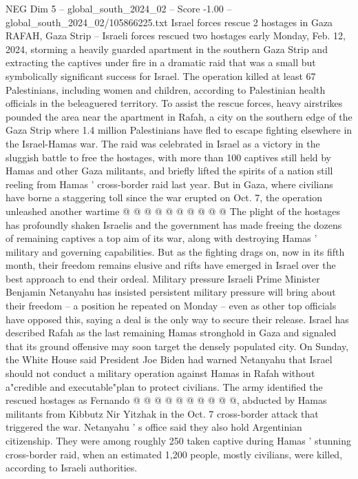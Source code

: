 \begin{textsample}{NEG Dim 5 – global\_south\_2024\_02 – Score -1.00 – global\_south\_2024\_02/105866225.txt}  \label{ex:f5_neg_251}
Israel forces rescue 2 hostages in Gaza RAFAH, Gaza Strip -- Israeli forces rescued two hostages early Monday, Feb. 12, 2024, storming a heavily guarded apartment in the southern Gaza Strip and extracting the captives under fire in a dramatic raid that was a small but symbolically significant success for Israel.
The operation killed at least 67 Palestinians, including women and children, according to Palestinian health officials in the beleaguered territory.
To assist the rescue forces, heavy airstrikes pounded the area near the apartment in Rafah, a city on the southern edge of the Gaza Strip where 1.4 million Palestinians have fled to escape fighting elsewhere in the Israel-Hamas war.
The raid was celebrated in Israel as a victory in the sluggish battle to free the hostages, with more than 100 captives still held by Hamas and other Gaza militants, and briefly lifted the spirits of a nation still reeling from Hamas ' cross-border raid last year.
But in Gaza, where civilians have borne a staggering toll since the war erupted on Oct. 7, the operation unleashed another wartime @ @ @ @ @ @ @ @ @ @ The plight of the hostages has profoundly shaken Israelis and the government has made freeing the dozens of remaining captives a top aim of its war, along with destroying Hamas ' military and governing capabilities.
But as the fighting drags on, now in its fifth month, their freedom remains elusive and rifts have emerged in Israel over the best approach to end their ordeal.
Military pressure Israeli Prime Minister Benjamin Netanyahu has insisted persistent military pressure will bring about their freedom -- a position he repeated on Monday -- even as other top officials have opposed this, saying a deal is the only way to secure their release.
Israel has described Rafah as the last remaining Hamas stronghold in Gaza and signaled that its ground offensive may soon target the densely populated city.
On Sunday, the White House said President Joe Biden had warned Netanyahu that Israel should not conduct a military operation against Hamas in Rafah without a"credible and executable"plan to protect civilians.
The army identified the rescued hostages as Fernando @ @ @ @ @ @ @ @ @ @, abducted by Hamas militants from Kibbutz Nir Yitzhak in the Oct. 7 cross-border attack that triggered the war.
Netanyahu ' s office said they also hold Argentinian citizenship.
They were among roughly 250 taken captive during Hamas ' stunning cross-border raid, when an estimated 1,200 people, mostly civilians, were killed, according to Israeli authorities.

\end{textsample}
